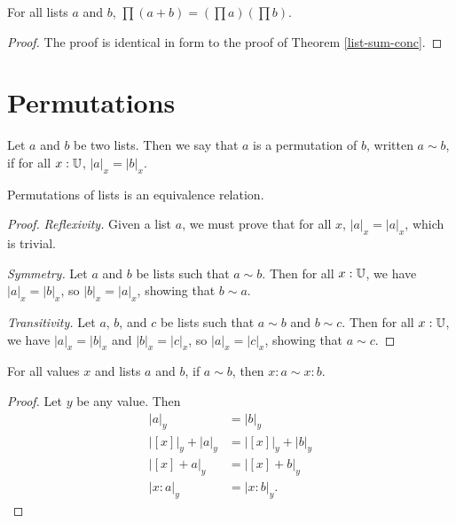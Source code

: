 \documentclass[../math.tex]{subfiles}
\begin{document}
\begin{theorem} \label{list-prod-conc}
    For all lists $a$ and $b$, $\prod (a + b) = (\prod a) (\prod b)$.
\end{theorem}
\begin{proof}
    The proof is identical in form to the proof of Theorem \ref{list-sum-conc}.
\end{proof}

\section{Permutations}

\begin{definition}
    Let $a$ and $b$ be two lists.  Then we say that $a$ is a permutation of $b$,
    written $a \sim b$, if for all $x : \mathbb{U}$, $|a|_x = |b|_x$.
\end{definition}

\begin{instance}
    Permutations of lists is an equivalence relation.
\end{instance}
\begin{proof}
    \textit{Reflexivity.}  Given a list $a$, we must prove that for all $x$,
    $|a|_x = |a|_x$, which is trivial.

    \textit{Symmetry.}  Let $a$ and $b$ be lists such that $a \sim b$.  Then for
    all $x : \mathbb{U}$, we have $|a|_x = |b|_x$, so $|b|_x = |a|_x$, showing that $b
    \sim a$.

    \textit{Transitivity.} Let $a$, $b$, and $c$ be lists such that $a \sim b$
    and $b \sim c$.  Then for all $x : \mathbb{U}$, we have $|a|_x = |b|_x$ and $|b|_x =
    |c|_x$, so $|a|_x = |c|_x$, showing that $a \sim c$.
\end{proof}

\begin{theorem} \label{list-perm-skip}
    For all values $x$ and lists $a$ and $b$, if $a \sim b$, then $x : a \sim x
    : b$.
\end{theorem}
\begin{proof}
    Let $y$ be any value.  Then
    \begin{align*}
        |a|_y &= |b|_y \\
        |[x]|_y + |a|_y &= |[x]|_y + |b|_y \\
        |[x] + a|_y &= |[x] + b|_y \\
        |x : a|_y &= |x : b|_y.
    \end{align*}
\end{proof}
\end{document}
